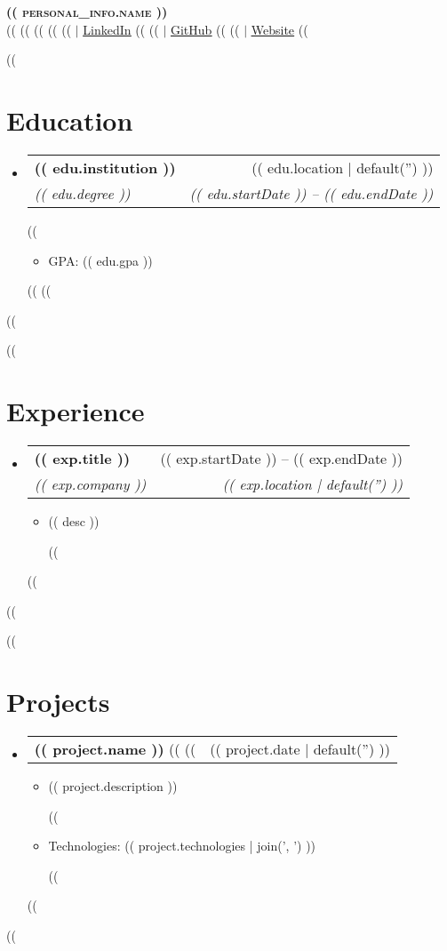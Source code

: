 \documentclass[letterpaper,11pt]{article}
\makeatletter
\newcommand{\resumeItem}[1]{
  \item\small{
    {#1 \vspace{-2pt}}
  }
}
\newcommand{\resumeSubheading}[4]{
  \vspace{-2pt}\item
    \begin{tabular*}{0.97\textwidth}[t]{l@{\extracolsep{\fill}}r}
      \textbf{#1} & #2 \\
      \textit{\small#3} & \textit{\small #4} \\
    \end{tabular*}\vspace{-7pt}
}
\newcommand{\resumeProjectHeading}[2]{
    \item
    \begin{tabular*}{0.97\textwidth}{l@{\extracolsep{\fill}}r}
      \small#1 & #2 \\
    \end{tabular*}\vspace{-7pt}
}
\newcommand{\resumeSubHeadingListStart}{\begin{itemize}[leftmargin=0.15in, label={}]}
\newcommand{\resumeSubHeadingListEnd}{\end{itemize}}
\newcommand{\resumeItemListStart}{\begin{itemize}}
\newcommand{\resumeItemListEnd}{\end{itemize}\vspace{-5pt}}
\makeatother
\begin{document}
\begin{center}
    \textbf{\Huge \scshape (( personal_info.name ))} \\ \vspace{1pt}
    \small 
    ((%
    ((%
        ((%
    ((%
    ((%
        $|$ \href{(( personal_info.linkedin ))}{\underline{LinkedIn}}
    ((%
    ((%
        $|$ \href{(( personal_info.github ))}{\underline{GitHub}}
    ((%
    ((%
        $|$ \href{(( personal_info.website ))}{\underline{Website}}
    ((%
\end{center}

((%
\section{Education}
  \resumeSubHeadingListStart
    ((%
    \resumeSubheading
      {(( edu.institution ))}{(( edu.location | default('') ))}
      {(( edu.degree ))}{(( edu.startDate )) -- (( edu.endDate ))}
      ((%
      \resumeItemListStart
        \resumeItem{GPA: (( edu.gpa ))}
      \resumeItemListEnd
      ((%
    ((%
  \resumeSubHeadingListEnd
((%

((%
\section{Experience}
  \resumeSubHeadingListStart
    ((%
    \resumeSubheading
      {(( exp.title ))}{(( exp.startDate )) -- (( exp.endDate ))}
      {(( exp.company ))}{(( exp.location | default('') ))}
      \resumeItemListStart
        ((%
        \resumeItem{(( desc ))}
        ((%
      \resumeItemListEnd
    ((%
  \resumeSubHeadingListEnd
((%

((%
\section{Projects}
    \resumeSubHeadingListStart
      ((%
      \resumeProjectHeading
          {\textbf{(( project.name ))} 
          ((%
          ((%
          }{(( project.date | default('') ))}
          \resumeItemListStart
            \resumeItem{(( project.description ))}
            ((%
            \resumeItem{Technologies: (( project.technologies | join(', ') ))}
            ((%
          \resumeItemListEnd
      ((%
    \resumeSubHeadingListEnd
((%
\end{document}

